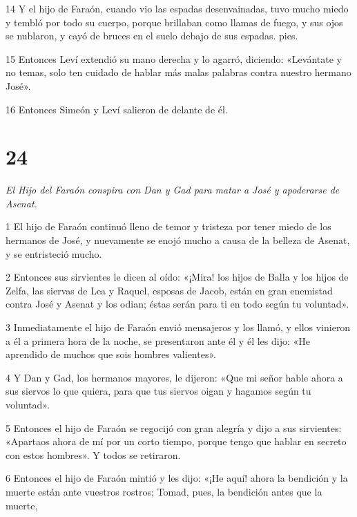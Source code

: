 \par 14 Y el hijo de Faraón, cuando vio las espadas desenvainadas, tuvo mucho miedo y tembló por todo su cuerpo, porque brillaban como llamas de fuego, y sus ojos se nublaron, y cayó de bruces en el suelo debajo de sus espadas. pies.

\par 15 Entonces Leví extendió su mano derecha y lo agarró, diciendo: «Levántate y no temas, solo ten cuidado de hablar más malas palabras contra nuestro hermano José».

\par 16 Entonces Simeón y Leví salieron de delante de él.

\chapter{24}

\par \textit{El Hijo del Faraón conspira con Dan y Gad para matar a José y apoderarse de Asenat.}


\par 1 El hijo de Faraón continuó lleno de temor y tristeza por tener miedo de los hermanos de José, y nuevamente se enojó mucho a causa de la belleza de Asenat, y se entristeció mucho.

\par 2 Entonces sus sirvientes le dicen al oído: «¡Mira! los hijos de Balla y los hijos de Zelfa, las siervas de Lea y Raquel, esposas de Jacob, están en gran enemistad contra José y Asenat y los odian; éstas serán para ti en todo según tu voluntad».

\par 3 Inmediatamente el hijo de Faraón envió mensajeros y los llamó, y ellos vinieron a él a primera hora de la noche, se presentaron ante él y él les dijo: «He aprendido de muchos que sois hombres valientes».

\par 4 Y Dan y Gad, los hermanos mayores, le dijeron: «Que mi señor hable ahora a sus siervos lo que quiera, para que tus siervos oigan y hagamos según tu voluntad».

\par 5 Entonces el hijo de Faraón se regocijó con gran alegría y dijo a sus sirvientes: «Apartaos ahora de mí por un corto tiempo, porque tengo que hablar en secreto con estos hombres». Y todos se retiraron.

\par 6 Entonces el hijo de Faraón mintió y les dijo: «¡He aquí! ahora la bendición y la muerte están ante vuestros rostros; Tomad, pues, la bendición antes que la muerte,

